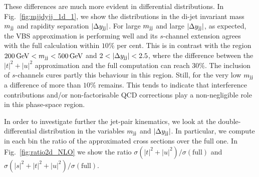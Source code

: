 These differences are much more evident in differential distributions.
In Fig.~\ref{fig:mjjdyjj_1d_1}, we show the distributions in the di-jet invariant mass $m_{\text{j}\text{j}}$ and rapidity separation $|\Delta y_{\text{j}\text{j}}|$.
For large $m_{\text{j}\text{j}}$ and large $|\Delta y_{\text{j}\text{j}}|$, as expected, the VBS approximation is performing well and its $s$-channel extension agrees with the full calculation within $10\%$ per cent.
This is in contrast with the region  $200 \,\text{GeV} < m_{\text{j}\text{j}} < 500 \,\text{GeV}$ and $2<|\Delta y_{\Pj\Pj}|<2.5$, where
the difference between the $|t|^2+|u|^2$ approximation and the full computation can reach $30\%$.
The inclusion of $s$-channels cures partly this behaviour in this region.
Still, for the very low $m_{\text{j}\text{j}}$ a difference of more than $10\%$ remains.
This tends to indicate that interference contributions and/or non-factorisable QCD corrections play a non-negligible role in this phase-space region.

In order to investigate further the jet-pair kinematics, we look at the double-differential distribution in the variables $m_{\text{j}\text{j}}$ and $|\Delta y_{\text{j}\text{j}}|$.
In particular, we compute in each bin the ratio of the approximated cross sections over the full one.
In Fig.~\ref{fig:ratio2d_NLO} we show the ratio $\sigma(|t|^2+|u|^2)/\sigma(\textrm{full})$ and $\sigma(|s|^2+|t|^2+|u|^2)/\sigma(\textrm{full})$.


